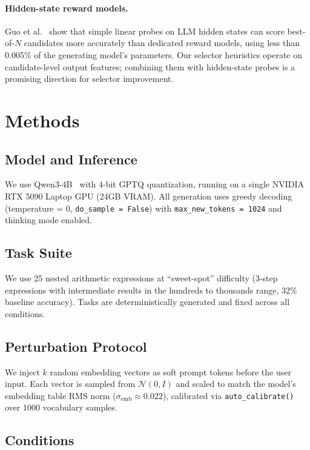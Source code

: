 \documentclass{article}
\begin{document}
\paragraph{Hidden-state reward models.}
Guo et al.~\cite{guo2025swift} show that simple linear probes on LLM
hidden states can score best-of-$N$ candidates more accurately than
dedicated reward models, using less than 0.005\% of the generating
model's parameters. Our selector heuristics operate on candidate-level
output features; combining them with hidden-state probes is a promising
direction for selector improvement.

\section{Methods} %

\subsection{Model and Inference}

We use Qwen3-4B~\cite{qwen2025} with 4-bit GPTQ quantization,
running on a single NVIDIA RTX 5090 Laptop GPU (24GB VRAM). All
generation uses greedy decoding (temperature = 0, \texttt{do\_sample =
False}) with \texttt{max\_new\_tokens = 1024} and thinking mode enabled.

\subsection{Task Suite}

We use 25 nested arithmetic expressions at ``sweet-spot'' difficulty
(3-step expressions with intermediate results in the hundreds to
thousands range, 32\% baseline accuracy). Tasks are deterministically
generated and fixed across all conditions.

\subsection{Perturbation Protocol}

We inject $k$ random embedding vectors as soft prompt tokens before
the user input. Each vector is sampled from $\mathcal{N}(0, I)$ and
scaled to match the model's embedding table RMS norm
($\sigma_{\text{emb}} \approx 0.022$), calibrated via
\texttt{auto\_calibrate()} over 1000 vocabulary samples.

\subsection{Conditions}
\end{document}
